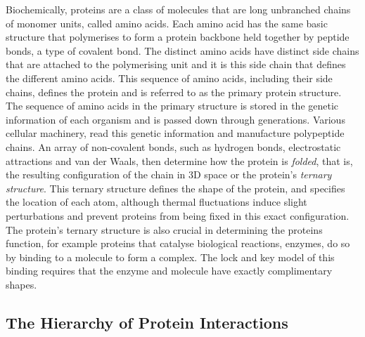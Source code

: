 Biochemically, proteins are a class of molecules that are long unbranched chains of monomer units, called amino acids. \cite{jones2002soft} Each amino acid has the same basic structure that polymerises to form a protein backbone held together by peptide bonds, a type of covalent bond. The distinct amino acids have distinct side chains that are attached to the polymerising unit and it is this side chain that defines the different amino acids. This sequence of amino acids, including their side chains, defines the protein and is referred to as the primary protein structure. \cite{alberts_molecular_2008} The sequence of amino acids in the primary structure is stored in the genetic information of each organism and is passed down through generations. Various cellular machinery, read this genetic information and manufacture polypeptide chains. An array of non-covalent bonds, such as hydrogen bonds, electrostatic attractions and van der Waals, then determine how the protein is \textit{folded}, that is, the resulting configuration of the chain in 3D space or the protein's \textit{ternary structure}. This ternary structure defines the shape of the protein, and specifies the location of each atom, although thermal fluctuations induce slight perturbations and prevent proteins from being fixed in this exact configuration. The protein's ternary structure is also crucial in determining the proteins function, for example proteins that catalyse biological reactions, enzymes, do so by binding to a molecule to form a complex. The lock and key model of this binding requires that the enzyme and molecule have exactly complimentary shapes. \cite{berg_biochemistry_2002}

\subsection{The Hierarchy of Protein Interactions}

